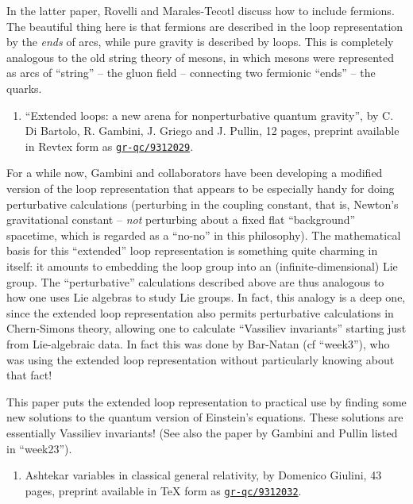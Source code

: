 \documentclass{article}
\def\tightlist{}
\begin{document}
In the latter paper, Rovelli and Marales-Tecotl discuss how to include
fermions. The beautiful thing here is that fermions are described in the
loop representation by the \emph{ends} of arcs, while pure gravity is
described by loops. This is completely analogous to the old string
theory of mesons, in which mesons were represented as arcs of ``string''
-- the gluon field -- connecting two fermionic ``ends'' -- the quarks.

\begin{enumerate}
\def\labelenumi{\arabic{enumi})}
\setcounter{enumi}{4}
\tightlist
\item
  ``Extended loops: a new arena for nonperturbative quantum gravity'',
  by C. Di Bartolo, R. Gambini, J. Griego and J. Pullin, 12 pages,
  preprint available in Revtex form as
  \href{http://xxx.lanl.gov/abs/gr-qc/9312029}{\texttt{gr-qc/9312029}}.
\end{enumerate}

For a while now, Gambini and collaborators have been developing a
modified version of the loop representation that appears to be
especially handy for doing perturbative calculations (perturbing in the
coupling constant, that is, Newton's gravitational constant --
\emph{not} perturbing about a fixed flat ``background'' spacetime, which
is regarded as a ``no-no'' in this philosophy). The mathematical basis
for this ``extended'' loop representation is something quite charming in
itself: it amounts to embedding the loop group into an
(infinite-dimensional) Lie group. The ``perturbative'' calculations
described above are thus analogous to how one uses Lie algebras to study
Lie groups. In fact, this analogy is a deep one, since the extended loop
representation also permits perturbative calculations in Chern-Simons
theory, allowing one to calculate ``Vassiliev invariants'' starting just
from Lie-algebraic data. In fact this was done by Bar-Natan (cf
``week3''), who was using the extended loop representation without
particularly knowing about that fact!

This paper puts the extended loop representation to practical use by
finding some new solutions to the quantum version of Einstein's
equations. These solutions are essentially Vassiliev invariants! (See
also the paper by Gambini and Pullin listed in ``week23'').

\begin{enumerate}
\def\labelenumi{\arabic{enumi})}
\setcounter{enumi}{5}
\tightlist
\item
  Ashtekar variables in classical general relativity, by Domenico
  Giulini, 43 pages, preprint available in TeX form as
  \href{http://xxx.lanl.gov/abs/gr-qc/9312032}{\texttt{gr-qc/9312032}}.
\end{enumerate}
\end{document}

